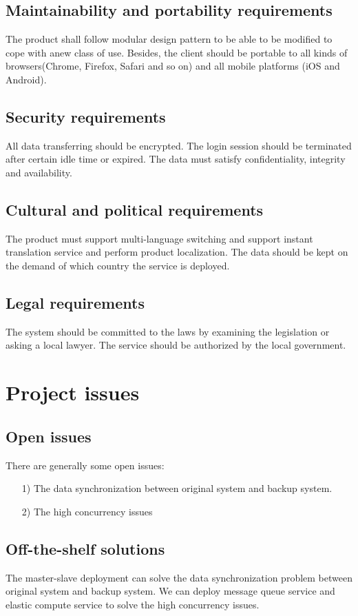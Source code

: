 \documentclass{scrreprt}
\begin{document}
\section{Maintainability and portability requirements}
The product shall follow modular design pattern to be able to be modified to cope with anew class of use. Besides, the client should be portable to all kinds of browsers(Chrome, Firefox, Safari and so on) and all mobile platforms (iOS and Android).  
\section{Security requirements}
All data transferring should be encrypted. The login session should be terminated after certain idle time or expired. The data must satisfy confidentiality, integrity and availability.
\section{Cultural and political requirements}
The product must support multi-language switching and support instant translation service and perform product localization. The data should be kept on the demand of which country the service is deployed. 
\section{Legal requirements}
The system should be committed to the laws by examining the legislation or asking a local lawyer. The service should be authorized by the local government.

\chapter{Project issues}
\section{Open issues}
There are generally some open issues:
\begin{enumerate}
    \item [1)] The data synchronization between original system and backup system. 
    \item [2)] The high concurrency issues

\end{enumerate}
\section{Off-the-shelf solutions}
The master-slave deployment can solve the data synchronization problem between original system and backup system. We can deploy message queue service and elastic compute service to solve the high concurrency issues.
\end{document}
